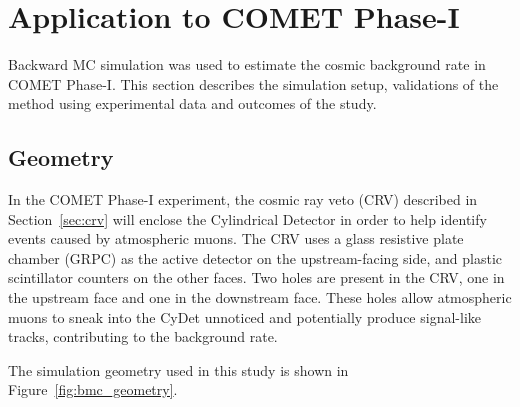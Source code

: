 \section{Application to COMET Phase-I}
Backward MC simulation was used to estimate the cosmic background rate in COMET
Phase-I. This section describes the simulation setup, validations of the method
using experimental data and outcomes of the study.

\subsection{Geometry}
In the COMET Phase-I experiment, the cosmic ray veto (CRV) described in
Section~\ref{sec:crv} will enclose the Cylindrical Detector in order to help
identify events caused by atmospheric muons. The CRV uses a glass resistive
plate chamber (GRPC) as the active detector on the upstream-facing side, and
plastic scintillator counters on the other faces. Two holes are present in the
CRV, one in the upstream face and one in the downstream face. These holes allow
atmospheric muons to sneak into the CyDet unnoticed and potentially produce
signal-like tracks, contributing to the background rate.

The simulation geometry used in this study is shown in
Figure~\ref{fig:bmc_geometry}. 

